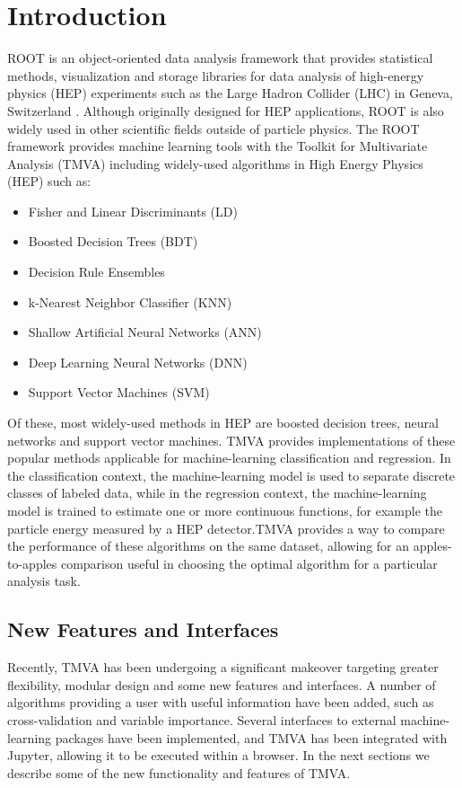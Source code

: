 \documentclass[a4paper]{jpconf}
\begin{document}
\section{Introduction}
ROOT is an object-oriented data analysis framework that provides statistical methods, visualization and storage libraries for data analysis of high-energy physics (HEP) experiments such as the Large Hadron Collider (LHC) in Geneva, Switzerland \cite{Antcheva20092499}. Although originally designed for HEP applications, ROOT is also widely used in other scientific fields outside of particle physics.\newline 
The ROOT framework provides machine learning tools with the Toolkit for Multivariate Analysis (TMVA) \cite{Hocker:2007ht} including widely-used algorithms in High Energy Physics (HEP) such as:
\begin{itemize}  
\item Fisher and Linear Discriminants (LD)
\item Boosted Decision Trees (BDT)
\item Decision Rule Ensembles
\item k-Nearest Neighbor Classifier (KNN)
\item Shallow Artificial Neural Networks (ANN)
\item Deep Learning Neural Networks (DNN)
\item Support Vector Machines (SVM)
\end{itemize}
Of these, most widely-used methods in HEP are boosted decision trees, neural networks and support vector machines. TMVA provides implementations of these popular methods applicable for machine-learning classification and regression. In the classification context, the machine-learning model is used to separate discrete classes of labeled data, while in the regression context, the machine-learning model is trained to estimate one or more continuous functions, for example the particle energy measured by a HEP detector.TMVA provides a way to compare the performance of these algorithms on the same dataset, allowing for an apples-to-apples comparison useful in choosing the optimal algorithm for a particular analysis task.

\subsection{New Features and Interfaces}
Recently, TMVA has  been undergoing a significant makeover targeting greater flexibility, modular design and some new features and interfaces. A number of algorithms providing a user with useful information have been added, such as cross-validation and variable importance. Several interfaces to external machine-learning packages have been implemented, and TMVA has been integrated with Jupyter, allowing it to be executed within a browser. In the next sections we describe some of the new functionality and features of TMVA.
\end{document}
